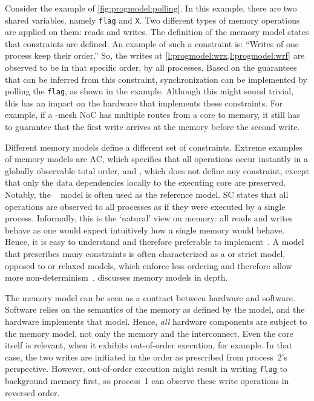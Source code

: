 Consider the example of \vref{fig:progmodel:polling}.
In this example, there are two shared variables, namely \lstinline|flag| and \lstinline|X|.
Two different types of memory operations are applied on them: reads and writes.
The definition of the memory model states that constraints are defined.
An example of such a constraint is: ``Writes of one process keep their order.''
So, the writes at \cref{l:progmodel:wrx,l:progmodel:wrf} are observed to be in that specific order, by all processes.
Based on the guarantees that can be inferred from this constraint, synchronization can be implemented by polling the \lstinline|flag|, as shown in the example.
Although this might sound trivial, this has an impact on the hardware that implements these constraints.
For example, if a -mesh \ac{NoC} has multiple routes from a core to memory, it still has to guarantee that the first write arrives at the memory before the second write.

Different memory models define a different set of constraints.
Extreme examples of memory models are \acl{AC}, which specifies that all operations occur instantly in a globally observable total order, and \SlowC, which does not define any constraint, except that only the data dependencies locally to the executing core are preserved.
Notably, the ~\cite{lamport:sequential_consistency} model is often used as the reference model.
\Ac{SC} states that all operations are observed to all processes as if they were executed by a single process.
Informally, this is the `natural' view on memory: all reads and writes behave as one would expect intuitively how a single memory would behave.
Hence, it is easy to understand and therefore preferable to implement~\cite{hill:simple_memmodel}.
A model that prescribes many constraints is often characterized as a \emph{} or strict model, opposed to \emph{} or relaxed models, which enforce less ordering and therefore allow more non-determinism~\cite{mosberger:memory_models,steinke:unified}.
 discusses memory models in depth.

The memory model can be seen as a contract between hardware and software.
Software relies on the semantics of the memory as defined by the model, and the hardware implements that model.
Hence, \emph{all} hardware components are subject to the memory model, not only the memory and the interconnect.
Even the core itself is relevant, when it exhibits out-of-order execution, for example.
In that case, the two writes are initiated in the order as prescribed from process~2's perspective.
However, out-of-order execution might result in writing \lstinline|flag| to background memory first, so process~1 can observe these write operations in reversed order.


